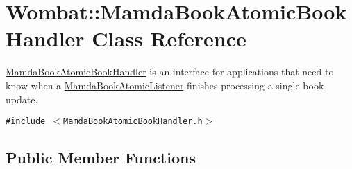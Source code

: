 \hypertarget{classWombat_1_1MamdaBookAtomicBookHandler}{
\section{Wombat::Mamda\-Book\-Atomic\-Book\-Handler Class Reference}
\label{classWombat_1_1MamdaBookAtomicBookHandler}
}
\hyperlink{classWombat_1_1MamdaBookAtomicBookHandler}{Mamda\-Book\-Atomic\-Book\-Handler} is an interface for applications that need to know when a \hyperlink{classWombat_1_1MamdaBookAtomicListener}{Mamda\-Book\-Atomic\-Listener} finishes processing a single book update.  


{\tt \#include $<$Mamda\-Book\-Atomic\-Book\-Handler.h$>$}

\subsection*{Public Member Functions}

